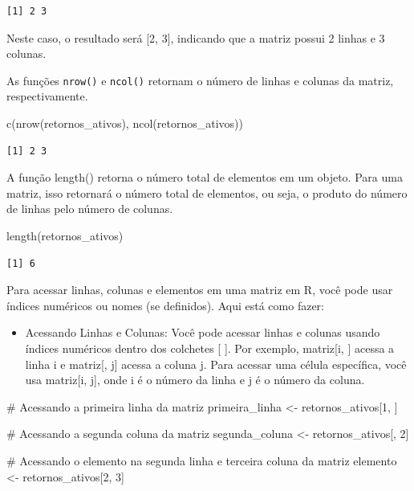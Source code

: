 \documentclass[
  letterpaper,
  DIV=11,
  numbers=noendperiod]{scrreprt}
\newenvironment{Shaded}{\begin{snugshade}}{\end{snugshade}}
\newcommand{\CommentTok}[1]{\textcolor[rgb]{0.37,0.37,0.37}{#1}}
\newcommand{\DecValTok}[1]{\textcolor[rgb]{0.68,0.00,0.00}{#1}}
\newcommand{\FunctionTok}[1]{\textcolor[rgb]{0.28,0.35,0.67}{#1}}
\newcommand{\NormalTok}[1]{\textcolor[rgb]{0.00,0.23,0.31}{#1}}
\newcommand{\OtherTok}[1]{\textcolor[rgb]{0.00,0.23,0.31}{#1}}
\providecommand{\tightlist}{%
  \setlength{\itemsep}{0pt}\setlength{\parskip}{0pt}}\usepackage{longtable,booktabs,array}
\begin{document}
\begin{verbatim}
[1] 2 3
\end{verbatim}

Neste caso, o resultado será {[}2, 3{]}, indicando que a matriz possui 2
linhas e 3 colunas.

As funções \texttt{nrow()} e \texttt{ncol()} retornam o número de linhas
e colunas da matriz, respectivamente.

\begin{Shaded}
\begin{Highlighting}[]
\FunctionTok{c}\NormalTok{(}\FunctionTok{nrow}\NormalTok{(retornos\_ativos), }\FunctionTok{ncol}\NormalTok{(retornos\_ativos))}
\end{Highlighting}
\end{Shaded}

\begin{verbatim}
[1] 2 3
\end{verbatim}

A função length() retorna o número total de elementos em um objeto. Para
uma matriz, isso retornará o número total de elementos, ou seja, o
produto do número de linhas pelo número de colunas.

\begin{Shaded}
\begin{Highlighting}[]
\FunctionTok{length}\NormalTok{(retornos\_ativos)}
\end{Highlighting}
\end{Shaded}

\begin{verbatim}
[1] 6
\end{verbatim}

Para acessar linhas, colunas e elementos em uma matriz em R, você pode
usar índices numéricos ou nomes (se definidos). Aqui está como fazer:

\begin{itemize}
\tightlist
\item
  Acessando Linhas e Colunas: Você pode acessar linhas e colunas usando
  índices numéricos dentro dos colchetes {[} {]}. Por exemplo,
  matriz{[}i, {]} acessa a linha i e matriz{[}, j{]} acessa a coluna j.
  Para acessar uma célula específica, você usa matriz{[}i, j{]}, onde i
  é o número da linha e j é o número da coluna.
\end{itemize}

\begin{Shaded}
\begin{Highlighting}[]
\CommentTok{\# Acessando a primeira linha da matriz}
\NormalTok{primeira\_linha }\OtherTok{\textless{}{-}}\NormalTok{ retornos\_ativos[}\DecValTok{1}\NormalTok{, ]}

\CommentTok{\# Acessando a segunda coluna da matriz}
\NormalTok{segunda\_coluna }\OtherTok{\textless{}{-}}\NormalTok{ retornos\_ativos[, }\DecValTok{2}\NormalTok{]}

\CommentTok{\# Acessando o elemento na segunda linha e terceira coluna da matriz}
\NormalTok{elemento }\OtherTok{\textless{}{-}}\NormalTok{ retornos\_ativos[}\DecValTok{2}\NormalTok{, }\DecValTok{3}\NormalTok{]}
\end{Highlighting}
\end{Shaded}
\end{document}
